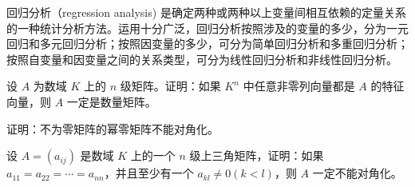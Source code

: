 \begin{conclusion}
回归分析（regression analysis) 是确定两种或两种以上变量间相互依赖的定量关系的一种统计分析方法。运用十分广泛，回归分析按照涉及的变量的多少，分为一元回归和多元回归分析；按照因变量的多少，可分为简单回归分析和多重回归分析；按照自变量和因变量之间的关系类型，可分为线性回归分析和非线性回归分析。
\end{conclusion}

\begin{problemset}
\item 设 $A$ 为数域 $K$ 上的 $n$ 级矩阵。证明：如果 $K^n$ 中任意非零列向量都是 $A$ 的特征向量，则 $A$ 一定是数量矩阵。
\item 证明：不为零矩阵的幂零矩阵不能对角化。
\item 设 $A = (a_{ij})$ 是数域 $K$ 上的一个 $n$ 级上三角矩阵，证明：如果 $a_{11} = a_{22} = \cdots = a_{nn}$，并且至少有一个 $a_{kl} \not = 0 (k < l)$，则 $A$ 一定不能对角化。
\end{problemset}